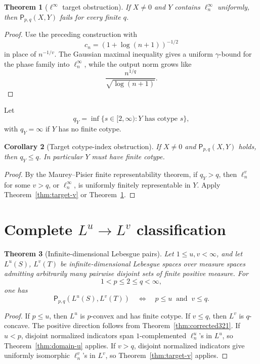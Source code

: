 \documentclass[11pt]{article}
\newtheorem{theorem}{Theorem}[section]
\newtheorem{corollary}[theorem]{Corollary}
\newcommand{\Pprop}{\mathsf P}
\newcommand{\gam}{\gamma}
\begin{document}
\begin{theorem}[\(\ell^\infty\) target obstruction]\label{thm:target-infty}
If \(X\ne0\) and \(Y\) contains \(\ell^\infty_n\) uniformly, then
\(\Pprop_{p,q}(X,Y)\) fails for every finite \(q\).
\end{theorem}

\begin{proof}
Use the preceding construction with
\[
  c_n=(1+\log(n+1))^{-1/2}
\]
in place of \(n^{-1/v}\).  The Gaussian maximal inequality gives a uniform
\(\gam\)-bound for the phase family into \(\ell^\infty_n\), while the output
norm grows like
\[
  \frac{n^{1/q}}{\sqrt{\log(n+1)}}.
\]
\end{proof}

Let
\[
  q_Y=\inf\{s\in[2,\infty):Y\text{ has cotype }s\},
\]
with \(q_Y=\infty\) if \(Y\) has no finite cotype.

\begin{corollary}[Target cotype-index obstruction]\label{cor:cotype}
If \(X\ne0\) and \(\Pprop_{p,q}(X,Y)\) holds, then \(q_Y\le q\).  In particular
\(Y\) must have finite cotype.
\end{corollary}

\begin{proof}
By the Maurey--Pisier finite representability theorem, if \(q_Y>q\), then
\(\ell^v_n\) for some \(v>q\), or \(\ell^\infty_n\), is uniformly finitely
representable in \(Y\).  Apply Theorem~\ref{thm:target-v} or
Theorem~\ref{thm:target-infty}.
\end{proof}

\section{Complete \(L^u\to L^v\) classification}

\begin{theorem}[Infinite-dimensional Lebesgue pairs]\label{thm:LuLv}
Let \(1\le u,v<\infty\), and let \(L^u(S)\), \(L^v(T)\) be
infinite-dimensional Lebesgue spaces over measure spaces admitting arbitrarily
many pairwise disjoint sets of finite positive measure.  For
\[
  1<p\le2\le q<\infty,
\]
one has
\[
  \Pprop_{p,q}(L^u(S),L^v(T))
  \quad\Longleftrightarrow\quad
  p\le u\ \text{ and }\ v\le q.
\]
\end{theorem}

\begin{proof}
If \(p\le u\), then \(L^u\) is \(p\)-convex and has finite cotype.  If
\(v\le q\), then \(L^v\) is \(q\)-concave.  The positive direction follows from
Theorem~\ref{thm:corrected321}.  If \(u<p\), disjoint normalized indicators
span \(1\)-complemented \(\ell^u_n\)'s in \(L^u\), so Theorem~\ref{thm:domain-u}
applies.  If \(v>q\), disjoint normalized indicators give uniformly
isomorphic \(\ell^v_n\)'s in \(L^v\), so Theorem~\ref{thm:target-v} applies.
\end{proof}
\end{document}
